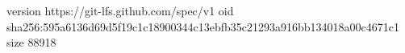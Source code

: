 version https://git-lfs.github.com/spec/v1
oid sha256:595a6136d69d5f19c1c18900344c13ebfb35c21293a916bb134018a00c4671c1
size 88918

